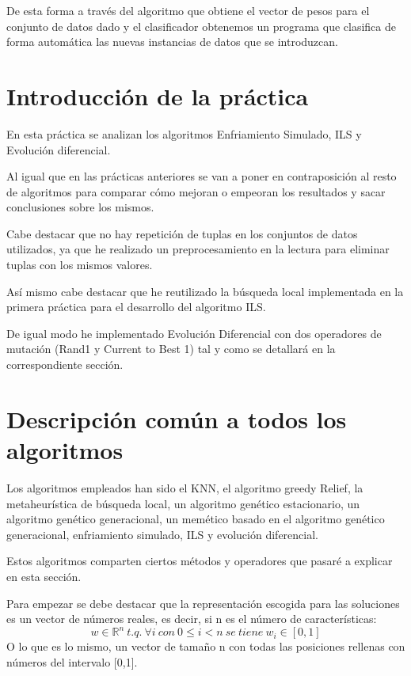 \documentclass[12pt,a4paper]{article}
\begin{document}
	De esta forma a través del algoritmo que obtiene el vector de pesos para el conjunto de datos dado y el clasificador obtenemos un programa que clasifica de forma automática las nuevas instancias de datos que se introduzcan.


	\section{Introducción de la práctica}
	\label{sec:introPractica}

	En esta práctica se analizan los algoritmos Enfriamiento Simulado, ILS y Evolución diferencial.
	
	Al igual que en las prácticas anteriores se van a poner en contraposición al resto de algoritmos para comparar cómo mejoran o empeoran los resultados y sacar conclusiones sobre los mismos.
	
	Cabe destacar que no hay repetición de tuplas en los conjuntos de datos utilizados, ya que he realizado un preprocesamiento en la lectura para eliminar tuplas con los mismos valores. 
	
	Así mismo cabe destacar que he reutilizado la búsqueda local implementada en la primera práctica para el desarrollo del algoritmo ILS.
	
	De igual modo he implementado Evolución Diferencial con dos operadores de mutación (Rand1 y Current to Best 1) tal y como se detallará en la correspondiente sección.

	\newpage

	\section{Descripción común a todos los algoritmos}

	Los algoritmos empleados han sido el KNN, el algoritmo greedy Relief, la metaheurística de búsqueda local, un algoritmo genético estacionario, un algoritmo genético generacional, un memético basado en el algoritmo genético generacional, enfriamiento simulado, ILS y evolución diferencial.
	
	Estos algoritmos comparten ciertos métodos y operadores que pasaré a explicar en esta sección.
	
	Para empezar se debe destacar que la representación escogida para las soluciones es un vector de números reales, es decir, si n es el número de características:
	$$w\in \mathbb{R}^n \ t.q. \ \forall i \ con \ 0\leq i < n \ se \ tiene \ w_i \in [0,1]$$
	O lo que es lo mismo, un vector de tamaño n con todas las posiciones rellenas con números del intervalo [0,1].
	
\end{document}
